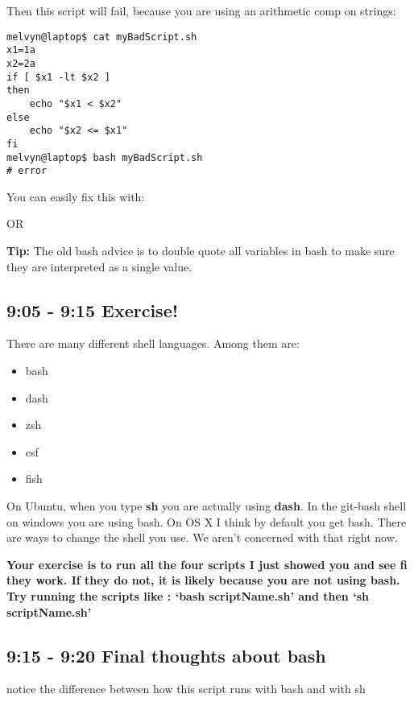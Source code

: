 \documentclass[12pt,a4paper]{article}
\begin{document}
Then this script will fail, because you are using an arithmetic comp on strings:

\begin{lstlisting}[style=term]
melvyn@laptop$ cat myBadScript.sh
x1=1a
x2=2a
if [ $x1 -lt $x2 ]        
then
    echo "$x1 < $x2"
else
    echo "$x2 <= $x1"
fi
melvyn@laptop$ bash myBadScript.sh
# error
\end{lstlisting}

You can easily fix this with:



OR




\textbf{Tip:} The old bash advice is to double quote all variables in bash to make sure they are interpreted as a single value.

\subsection{9:05 - 9:15 Exercise!}

There are many different shell languages. Among them are:

\begin{itemize}
\item bash
\item dash
\item zsh
\item csf
\item fish
\end{itemize}

On Ubuntu, when you type \textbf{sh} you are actually using \textbf{dash}. In
the git-bash shell on windows you are using bash. On OS X I think by default you
get bash. There are ways to change the shell you use. We aren't concerned with
that right now.

\textbf{Your exercise is to run all the four scripts I just showed you and see
fi they work. If they do not, it is likely because you are not using bash. Try
running the scripts like  : `bash scriptName.sh' and then `sh scriptName.sh'}

\subsection{9:15 - 9:20 Final thoughts about bash}
notice the difference between how this script runs with bash and with sh
\end{document}
